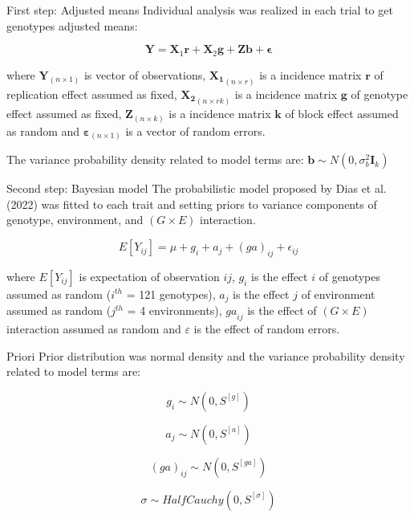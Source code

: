 \documentclass[
  ignorenonframetext,
  aspectratio=169,
]{beamer}
\begin{document}
\begin{frame}{First step: Adjusted means}
\label{first-step-adjusted-means}
Individual analysis was realized in each trial to get genotypes adjusted
means:

\[
 \mathbf{Y} = \mathbf{X}_{1}\mathbf{r} + \mathbf{X}_{2}\mathbf{g} + \mathbf{Z}\mathbf{b} + \boldsymbol{\epsilon}
\]

where \(\mathbf{Y}_{(n\times1)}\) is vector of observations,
\(\mathbf{X_1}_{(n \times r)}\) is a incidence matrix \(\textbf{r}\) of
replication effect assumed as fixed, \(\mathbf{X_2}_{(n\times rk)}\) is
a incidence matrix \(\textbf{g}\) of genotype effect assumed as fixed,
\(\mathbf{Z}_{(n\times k)}\) is a incidence matrix \(\textbf{k}\) of
block effect assumed as random and
\(\mathbf{\varepsilon}_{(n\times 1)}\) is a vector of random errors.

The variance probability density related to model terms are:
\(\textbf{b} \sim N (0,\sigma_{b}^{2}\mathbf{I}_k)\)
\end{frame}

\begin{frame}{Second step: Bayesian model}
\label{second-step-bayesian-model}
The probabilistic model proposed by Dias et al. (2022) was fitted to
each trait and setting priors to variance components of genotype,
environment, and \((G\times E)\) interaction.

\[
E[{Y}_{ij}] = {\mu} + {g}_i + {a}_j + {(ga)}_{ij} + {\epsilon}_{ij}
\]

where \(E[{Y}_{ij}]\) is expectation of observation \(ij\), \({g}_{i}\)
is the effect \(i\) of genotypes assumed as random (\(i^{th}\) = 121
genotypes), \({a}_{j}\) is the effect \(j\) of environment assumed as
random (\(j^{th}\) = 4 environments), \({ga}_{ij}\) is the effect of
\((G\times E)\) interaction assumed as random and \({\varepsilon}\) is
the effect of random errors.
\end{frame}

\begin{frame}{Priori}
\label{priori}
Prior distribution was normal density and the variance probability
density related to model terms are:

\[{g}_i \sim N (0,{S}^{[g]})\]

\[{a}_j \sim N (0,{S}^{[a]})\]

\[{(ga)}_{ij} \sim N (0,{S}^{[ga]})\]

\[{\sigma} \sim HalfCauchy (0,{S}^{[\sigma]})\]
\end{frame}
\end{document}
